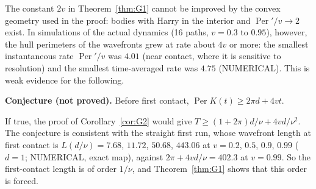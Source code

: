 \begin{remark}\label{rem:G1-conj}
The constant $2v$ in Theorem~\ref{thm:G1} cannot be improved by the convex geometry used in the proof: bodies with Harry in the
interior and $\operatorname{Per}'/v\to2$ exist. In simulations of the actual dynamics (16 paths, $v=0.3$ to $0.95$), however, the
hull perimeters of the wavefronts grew at rate about $4v$ or more: the smallest instantaneous rate $\operatorname{Per}'/v$ was $4.01$
(near contact, where it is sensitive to resolution) and the smallest time-averaged rate was $4.75$ (NUMERICAL). This is weak
evidence for the following.

\smallskip\noindent\textbf{Conjecture (not proved).} Before first contact, $\operatorname{Per}K(t)\ge2\pi d+4vt$.

\smallskip\noindent
If true, the proof of Corollary~\ref{cor:G2} would give $T\ge(1+2\pi)d/\nu+4vd/\nu^2$. The conjecture is consistent with the straight
first run, whose wavefront length at first contact is $L(d/\nu)=7.68$, $11.72$, $50.68$, $443.06$ at $v=0.2$, $0.5$, $0.9$, $0.99$
($d=1$; NUMERICAL, exact map), against $2\pi+4vd/\nu=402.3$ at $v=0.99$. So the first-contact length is of order $1/\nu$, and
Theorem~\ref{thm:G1} shows that this order is forced.
\end{remark}

